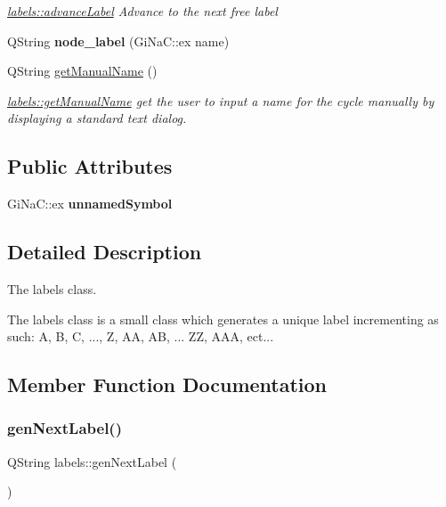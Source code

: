\begin{DoxyCompactItemize}
\begin{DoxyCompactList}\small\item\em \mbox{\hyperlink{classlabels_a790344f0c86546b9b5fdda30dbe690a5}{labels\+::advance\+Label}} Advance to the next free label \end{DoxyCompactList}\item 
\mbox{\label{classlabels_a87859b44a590675af2f05213e09e723e}} 
Q\+String {\bfseries node\+\_\+label} (Gi\+Na\+C\+::ex name)
\item 
Q\+String \mbox{\hyperlink{classlabels_a629e15f96a5f73b4bfdb9b18b9b98092}{get\+Manual\+Name}} ()
\begin{DoxyCompactList}\small\item\em \mbox{\hyperlink{classlabels_a629e15f96a5f73b4bfdb9b18b9b98092}{labels\+::get\+Manual\+Name}} get the user to input a name for the cycle manually by displaying a standard text dialog. \end{DoxyCompactList}\end{DoxyCompactItemize}
\subsection*{Public Attributes}
\begin{DoxyCompactItemize}
\item 
\mbox{\label{classlabels_adec1585f4f5a3e449ce6e825717114af}} 
Gi\+Na\+C\+::ex {\bfseries unnamed\+Symbol}
\end{DoxyCompactItemize}


\subsection{Detailed Description}
The labels class. 

The labels class is a small class which generates a unique label incrementing as such\+: A, B, C, ..., Z, AA, AB, ... ZZ, A\+AA, ect... 

\subsection{Member Function Documentation}
\mbox{\label{classlabels_a70a7436dbef91e342fec4ec3130187e2}} 
\subsubsection{\texorpdfstring{gen\+Next\+Label()}{genNextLabel()}}
{\footnotesize\ttfamily Q\+String labels\+::gen\+Next\+Label (\begin{DoxyParamCaption}{ }\end{DoxyParamCaption})}



